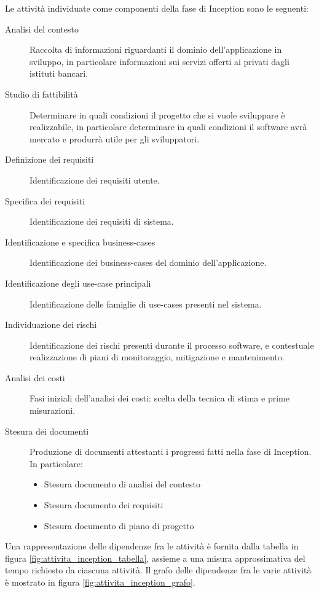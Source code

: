 Le attivit\`a individuate come componenti della fase di Inception sono le seguenti:
\begin{description}
	\item[Analisi del contesto]
		Raccolta di informazioni riguardanti il dominio dell'applicazione in sviluppo, in particolare informazioni sui servizi offerti ai privati dagli istituti bancari.
	\item[Studio di fattibilit\`a]
		Determinare in quali condizioni il progetto che si vuole sviluppare \`e realizzabile, in particolare determinare in quali condizioni il software avr\`a mercato e produrr\`a utile per gli sviluppatori.
	\item[Definizione dei requisiti]
		Identificazione dei requisiti utente.
	\item[Specifica dei requisiti]
		Identificazione dei requisiti di sistema.
	\item[Identificazione e specifica business-cases]
		Identificazione dei business-cases del dominio dell'applicazione.
	\item[Identificazione degli use-case principali]
		Identificazione delle famiglie di use-cases presenti nel sistema.
	\item[Individuazione dei rischi]
		Identificazione dei rischi presenti durante il processo software, e contestuale realizzazione di piani di monitoraggio, mitigazione e mantenimento.
	\item[Analisi dei costi]
		Fasi iniziali dell'analisi dei costi: scelta della tecnica di stima e prime misurazioni.
	\item[Stesura dei documenti]
		Produzione di documenti attestanti i progressi fatti nella fase di Inception.
		In particolare:
		\begin{itemize}
			\item Stesura documento di analisi del contesto
			\item Stesura documento dei requisiti
			\item Stesura documento di piano di progetto
		\end{itemize}
\end{description}
Una rappresentazione delle dipendenze fra le attivit\`a \`e fornita dalla tabella in figura \ref{fig:attivita_inception_tabella}, assieme a una misura approssimativa del tempo richiesto da ciascuna attivit\`a.
Il grafo delle dipendenze fra le varie attivit\`a \`e mostrato in figura \ref{fig:attivita_inception_grafo}.

